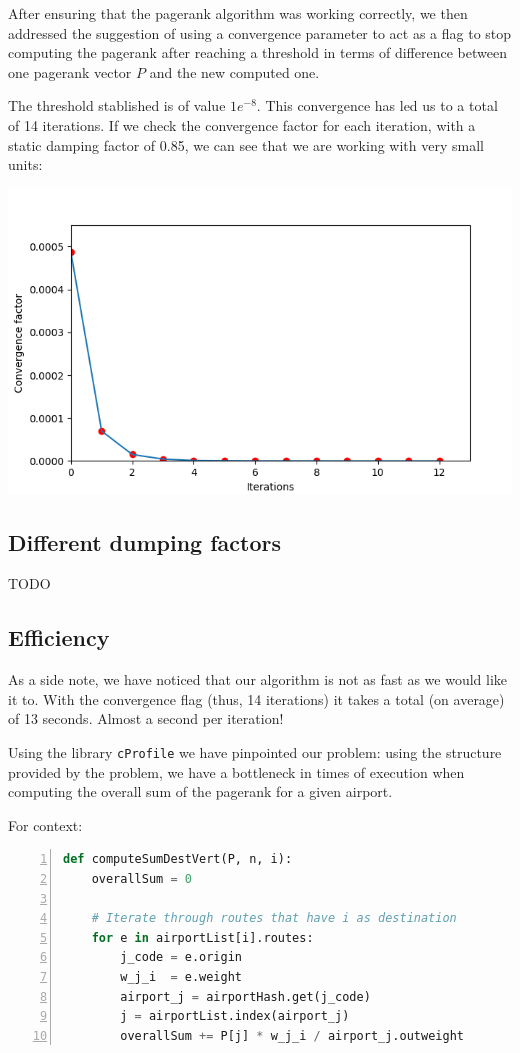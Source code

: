 \documentclass[10pt, a4paper]{article}
\begin{document}
\noindent After ensuring that the pagerank algorithm was working correctly, we then addressed the suggestion of using a convergence parameter to act as a flag to stop computing the pagerank after reaching a threshold in terms of difference between one pagerank vector $P$ and the new computed one.


The threshold stablished is of value  $1e^{-8}$.  This convergence has led us to a total of 14 iterations. If we check the convergence factor for each iteration, with a static damping factor of 0.85, we can see that we are working with very small units:
\begin{center}
        \includegraphics[width=0.75\linewidth]{plot_conv.png}
\end{center}


\subsection{Different dumping factors}

TODO

\subsection{Efficiency}
As a side note, we have noticed that our algorithm is not as fast as we would like it to. With the convergence flag (thus, 14 iterations) it takes a total (on average) of 13 seconds. Almost a second per iteration!

Using the library \texttt{cProfile} we have pinpointed our problem: using the structure provided by the problem, 
we have a bottleneck in times of execution when computing the overall sum of the pagerank for a given airport. 

For context:

\begin{lstlisting}[language=Python,  breaklines=true, numbers=left,   frame=single]
def computeSumDestVert(P, n, i):
    overallSum = 0

    # Iterate through routes that have i as destination
    for e in airportList[i].routes:
        j_code = e.origin
        w_j_i  = e.weight
        airport_j = airportHash.get(j_code)
        j = airportList.index(airport_j)
        overallSum += P[j] * w_j_i / airport_j.outweight
\end{lstlisting}
\end{document}
